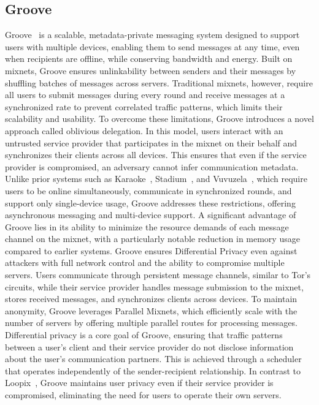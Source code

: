 \subsection{Groove}\label{subsec:groove}
Groove~\cite{Groove} is a scalable, metadata-private messaging system designed to support users with multiple devices, enabling them to send messages at any time, even when recipients are offline, while conserving bandwidth and energy. Built on mixnets, Groove ensures unlinkability between senders and their messages by shuffling batches of messages across servers. Traditional mixnets, however, require all users to submit messages during every round and receive messages at a synchronized rate to prevent correlated traffic patterns, which limits their scalability and usability.
To overcome these limitations, Groove introduces a novel approach called oblivious delegation. In this model, users interact with an untrusted service provider that participates in the mixnet on their behalf and synchronizes their clients across all devices. This ensures that even if the service provider is compromised, an adversary cannot infer communication metadata. Unlike prior systems such as Karaoke~\cite{Karaoke}, Stadium~\cite{Stadium}, and Vuvuzela~\cite{Vuvuzela}, which require users to be online simultaneously, communicate in synchronized rounds, and support only single-device usage, Groove addresses these restrictions, offering asynchronous messaging and multi-device support.
A significant advantage of Groove lies in its ability to minimize the resource demands of each message channel on the mixnet, with a particularly notable reduction in memory usage compared to earlier systems. Groove ensures Differential Privacy even against attackers with full network control and the ability to compromise multiple servers. Users communicate through persistent message channels, similar to Tor's circuits, while their service provider handles message submission to the mixnet, stores received messages, and synchronizes clients across devices. To maintain anonymity, Groove leverages Parallel Mixnets, which efficiently scale with the number of servers by offering multiple parallel routes for processing messages.
Differential privacy is a core goal of Groove, ensuring that traffic patterns between a user's client and their service provider do not disclose information about the user's communication partners. This is achieved through a scheduler that operates independently of the sender-recipient relationship. In contrast to Loopix~\cite{Loopix}, Groove maintains user privacy even if their service provider is compromised, eliminating the need for users to operate their own servers.

